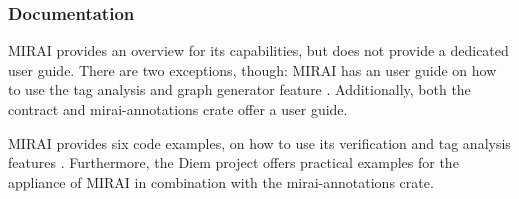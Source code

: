 \subsubsection{Documentation}

MIRAI provides an overview \cite{facebookexperimental_miraidocumentationoverviewmd_2021} for its capabilities, but does not provide a dedicated user guide. There are two exceptions, though: MIRAI has an user guide on how to use the tag analysis \cite{facebookexperimental_miraidocumentationtaganalysismd_2021} and graph generator feature \cite{facebookexperimental_miraidocumentationcallgraphmd_2022}. Additionally, both the contract \cite{karroffel_contracts_2023} and mirai-annotations \cite{herman_venter_mirai-annotations_2023} crate offer a user guide.

MIRAI provides six code examples, on how to use its verification and tag analysis features \cite{facebookexperimental_miraiexamples_2023}.
Furthermore, the Diem project \cite{diem_diemdiem_2023} offers practical examples for the appliance of MIRAI in combination with the mirai-annotations crate.
